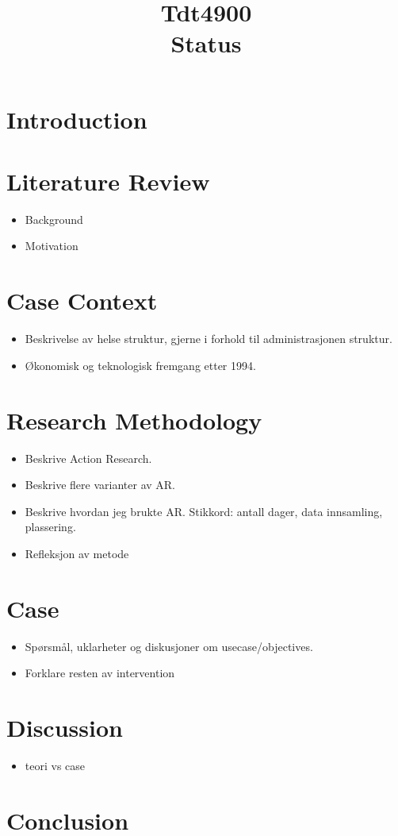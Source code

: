 \documentclass{article}
\title{Tdt4900 \\ Status}
\begin{document}
\section{Introduction}

\section{Literature Review}
\begin{itemize}
\item Background
\item Motivation
\end{itemize}
\section{Case Context}
\begin{itemize}
\item Beskrivelse av helse struktur, gjerne i forhold til administrasjonen struktur.
\item Økonomisk og teknologisk fremgang etter 1994.
\end{itemize}
\section{Research Methodology}
\begin{itemize}
\item Beskrive Action Research.
\item Beskrive flere varianter av AR.
\item Beskrive hvordan jeg brukte AR. Stikkord: antall dager, data innsamling, plassering.
\item Refleksjon av metode
\end{itemize}
\section{Case}
\begin{itemize}
\item Spørsmål, uklarheter og diskusjoner om usecase/objectives.
\item Forklare resten av intervention
\end{itemize}
\section{Discussion}
\begin{itemize}
\item teori vs case
\end{itemize}
\section{Conclusion}
\end{document}
